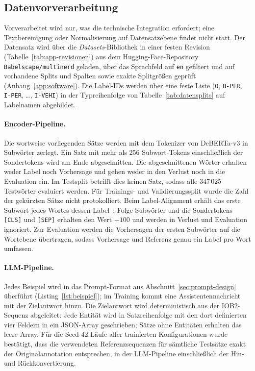 \subsection{Datenvorverarbeitung}
\label{sec:datenvorverarbeitung}

Vorverarbeitet wird nur, was die technische Integration erfordert; eine
Textbereinigung oder Normalisierung auf Datensatzebene findet nicht
statt.
Der Datensatz wird über die \emph{Datasets}-Bibliothek in einer festen
Revision (Tabelle~\ref{tab:app-revisionen}) aus dem
Hugging-Face-Repository \texttt{Babelscape/\allowbreak multinerd} geladen,
über das Sprachfeld auf \texttt{en} gefiltert und auf vorhandene Splits
und Spalten sowie exakte Splitgrößen geprüft
(Anhang~\ref{app:software}).
Die Label-IDs werden über eine feste Liste (\texttt{O}, \texttt{B-PER},
\texttt{I-PER}, \dots, \texttt{I-VEHI}) in der Typreihenfolge von
Tabelle~\ref{tab:datensplits} auf Labelnamen abgebildet.

\paragraph{Encoder-Pipeline.}
Die wortweise vorliegenden Sätze werden mit dem Tokenizer von DeBERTa-v3
in Subwörter zerlegt.
Ein Satz mit mehr als 256 Subwort-Tokens einschließlich der Sondertokens
wird am Ende abgeschnitten. Die abgeschnittenen Wörter erhalten weder
Label noch Vorhersage und gehen weder in den Verlust noch in die
Evaluation ein.
Im Testsplit betrifft dies keinen Satz, sodass alle 347\,025 Testwörter
evaluiert werden. Für Trainings- und Validierungssplit wurde die Zahl
der gekürzten Sätze nicht protokolliert.
Beim Label-Alignment erhält das erste Subwort jedes Wortes dessen
Label~\cite{devlin2019bert};
Folge-Subwörter und die Sondertokens \texttt{[CLS]} und \texttt{[SEP]}
erhalten den Wert $-100$ und werden in Verlust und Evaluation ignoriert.
Zur Evaluation werden die Vorhersagen der ersten Subwörter auf die
Wortebene übertragen, sodass Vorhersage und Referenz genau ein Label
pro Wort umfassen.

\paragraph{LLM-Pipeline.}
Jedes Beispiel wird in das Prompt-Format aus
Abschnitt~\ref{sec:prompt-design} überführt
(Listing~\ref{lst:beispiel}); im Training kommt eine
Assistentennachricht mit der Zielantwort hinzu.
Die Zielantwort wird deterministisch aus der IOB2-Sequenz abgeleitet: Jede
Entität wird in Satzreihenfolge mit den dort definierten vier Feldern
in ein JSON-Array geschrieben; Sätze
ohne Entitäten erhalten das leere Array.
Für die Seed-42-Läufe aller trainierten Konfigurationen wurde bestätigt,
dass die verwendeten Referenzsequenzen für sämtliche Testsätze exakt der
Originalannotation entsprechen, in der LLM-Pipeline einschließlich der
Hin- und Rückkonvertierung.

